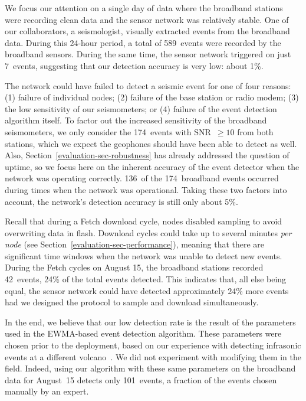 We focus our attention on a single day of data where the broadband stations
were recording clean data and the sensor network was relatively stable. One
of our collaborators, a seismologist, visually extracted events from the
broadband data. During this 24-hour period, a total of 589~events were
recorded by the broadband sensors. During the same time, the sensor network
triggered on just 7~events, suggesting that our detection accuracy is very
low: about 1\%.

The network could have failed to detect a seismic event for one of four
reasons: (1) failure of individual nodes; (2) failure of the base station or
radio modem; (3) the low sensitivity of our seismometers; or (4) failure of
the event detection algorithm itself. To factor out the increased sensitivity
of the broadband seismometers, we only consider the 174~events with SNR~$\geq
10$ from both stations, which we expect the geophones should have been able
to detect as well. Also, Section~\ref{evaluation-sec-robustness} has already
addressed the question of uptime, so we focus here on the inherent accuracy
of the event detector when the network was operating correctly. 136~of the
174~broadband events occurred during times when the network was operational.
Taking these two factors into account, the network's detection accuracy is
still only about 5\%. 

Recall that during a Fetch download cycle, nodes disabled sampling to avoid
overwriting data in flash. Download cycles could take up to several minutes
\textit{per node} (see Section~\ref{evaluation-sec-performance}), meaning
that there are significant time windows when the network was unable to detect
new events. During the Fetch cycles on August 15, the broadband stations
recorded 42~events, 24\% of the total events detected. This indicates that,
all else being equal, the sensor network could have detected approximately
24\% more events had we designed the protocol to sample and download
simultaneously. 

In the end, we believe that our low detection rate is the result of the
parameters used in the EWMA-based event detection algorithm. These parameters
were chosen prior to the deployment, based on our experience with detecting
infrasonic events at a different volcano~\cite{volcano-ewsn05}. We did not
experiment with modifying them in the field. Indeed, using our algorithm with
these same parameters on the broadband data for August~15 detects only
101~events, a fraction of the events chosen manually by an expert. 
